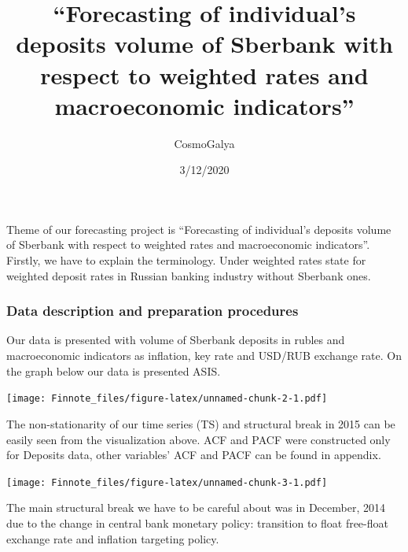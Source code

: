 \documentclass[
]{article}
\title{``Forecasting of individual's deposits volume of Sberbank with
respect to weighted rates and macroeconomic indicators''}
\author{CosmoGalya}
\date{3/12/2020}
\begin{document}
\maketitle

Theme of our forecasting project is ``Forecasting of individual's
deposits volume of Sberbank with respect to weighted rates and
macroeconomic indicators''. Firstly, we have to explain the terminology.
Under weighted rates state for weighted deposit rates in Russian banking
industry without Sberbank ones.

\hypertarget{data-description-and-preparation-procedures}{%
\subsubsection{Data description and preparation
procedures}\label{data-description-and-preparation-procedures}}

Our data is presented with volume of Sberbank deposits in rubles and
macroeconomic indicators as inflation, key rate and USD/RUB exchange
rate. On the graph below our data is presented ASIS.

\texttt{[image: Finnote\_files/figure-latex/unnamed-chunk-2-1.pdf]}

The non-stationarity of our time series (TS) and structural break in
2015 can be easily seen from the visualization above. ACF and PACF were
constructed only for Deposits data, other variables' ACF and PACF can be
found in appendix.

\texttt{[image: Finnote\_files/figure-latex/unnamed-chunk-3-1.pdf]}

The main structural break we have to be careful about was in December,
2014 due to the change in central bank monetary policy: transition to
float free-float exchange rate and inflation targeting policy.
\end{document}

